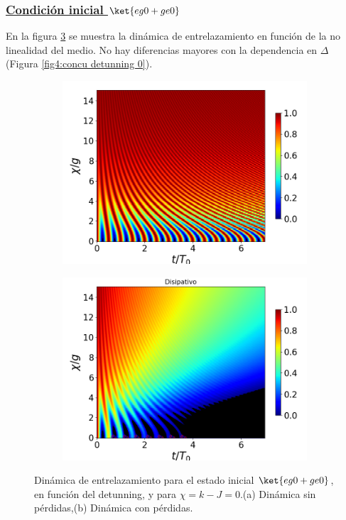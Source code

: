 \subsubsection{\underline{Condición inicial $\ket{eg0+ge0}$}}
En la figura \ref{fig4:concu x 0} se muestra la dinámica de entrelazamiento en función de la no linealidad del medio. No hay diferencias mayores con la dependencia en $\Delta$ (Figura \ref{fig4:concu detunning 0}).
\begin{figure}[h!]
    \centering
    \begin{subfigure}{0.49\textwidth}
        \includegraphics[width=\textwidth]{figuras/ch4/concu/chi/eg0+ge0 d=0.0g k=0.0g J=0.0g gamma=0.25g concu chi uni.png}
        \caption{}
        \label{fig4:concu x 0 uni}
    \end{subfigure}
    \hfill
    \begin{subfigure}{0.49\textwidth}
        \includegraphics[width=\textwidth]{figuras/ch4/concu/chi/eg0+ge0 d=0.0g k=0.0g J=0.0g gamma=0.25g concu chi dis.png}
        \caption{}
        \label{fig4:concu x 0 dis}
    \end{subfigure}
    \caption{Dinámica de entrelazamiento para el estado inicial $\ket{eg0+ge0}$, en función del detunning, y para $\chi=k-J=0$.(a) Dinámica sin pérdidas,(b) Dinámica con pérdidas.}
    \label{fig4:concu x 0}
\end{figure}

